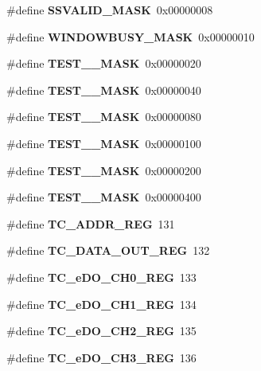 \begin{DoxyCompactItemize}
\#define {\bfseries S\+S\+V\+A\+L\+I\+D\+\_\+\+M\+A\+SK}~0x00000008
\item 
\mbox{\label{_t_a_r_g_e_t_c___register_map_8h_ac2e0faa3c4766775b9fbc072eead0651}} 
\#define {\bfseries W\+I\+N\+D\+O\+W\+B\+U\+S\+Y\+\_\+\+M\+A\+SK}~0x00000010
\item 
\mbox{\label{_t_a_r_g_e_t_c___register_map_8h_a03771b2d7e75227c7dae01578302b323}} 
\#define {\bfseries T\+E\+S\+T\+\_\+\_\+\+M\+A\+SK}~0x00000020
\item 
\mbox{\label{_t_a_r_g_e_t_c___register_map_8h_a6f5d529ea2d977a55f32fc9e38e1edab}} 
\#define {\bfseries T\+E\+S\+T\+\_\+\_\+\+M\+A\+SK}~0x00000040
\item 
\mbox{\label{_t_a_r_g_e_t_c___register_map_8h_a1751db110608ea50e37fa9222c3fc5b3}} 
\#define {\bfseries T\+E\+S\+T\+\_\+\_\+\+M\+A\+SK}~0x00000080
\item 
\mbox{\label{_t_a_r_g_e_t_c___register_map_8h_a7550bb116d5645380c9b3e2d599cda62}} 
\#define {\bfseries T\+E\+S\+T\+\_\+\_\+\+M\+A\+SK}~0x00000100
\item 
\mbox{\label{_t_a_r_g_e_t_c___register_map_8h_acb9fd167490aaf39cfe4071652c7e2be}} 
\#define {\bfseries T\+E\+S\+T\+\_\+\_\+\+M\+A\+SK}~0x00000200
\item 
\mbox{\label{_t_a_r_g_e_t_c___register_map_8h_afada988d0856345c59b2bb3a8fb3fecb}} 
\#define {\bfseries T\+E\+S\+T\+\_\+\_\+\+M\+A\+SK}~0x00000400
\item 
\mbox{\label{_t_a_r_g_e_t_c___register_map_8h_a541a68bae30e30500105023cee98510a}} 
\#define {\bfseries T\+C\+\_\+\+A\+D\+D\+R\+\_\+\+R\+EG}~131
\item 
\mbox{\label{_t_a_r_g_e_t_c___register_map_8h_a2e5a2c236b51f5b33c83818b054b2361}} 
\#define {\bfseries T\+C\+\_\+\+D\+A\+T\+A\+\_\+\+O\+U\+T\+\_\+\+R\+EG}~132
\item 
\mbox{\label{_t_a_r_g_e_t_c___register_map_8h_a40b8d179eced9e0232eb8f323e1bdc9d}} 
\#define {\bfseries T\+C\+\_\+e\+D\+O\+\_\+\+C\+H0\+\_\+\+R\+EG}~133
\item 
\mbox{\label{_t_a_r_g_e_t_c___register_map_8h_aba1b2b59ff837fb5cd09d54fd982cdfe}} 
\#define {\bfseries T\+C\+\_\+e\+D\+O\+\_\+\+C\+H1\+\_\+\+R\+EG}~134
\item 
\mbox{\label{_t_a_r_g_e_t_c___register_map_8h_a3c80cf8b07eb66f7831ba7a43fb33764}} 
\#define {\bfseries T\+C\+\_\+e\+D\+O\+\_\+\+C\+H2\+\_\+\+R\+EG}~135
\item 
\mbox{\label{_t_a_r_g_e_t_c___register_map_8h_a6eed0aea901f042f61f48784f5811aa7}} 
\#define {\bfseries T\+C\+\_\+e\+D\+O\+\_\+\+C\+H3\+\_\+\+R\+EG}~136

\end{DoxyCompactItemize}
